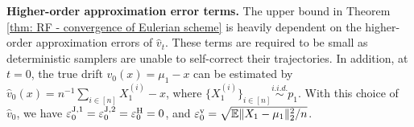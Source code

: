 \documentclass{article}
\theoremstyle{plain}
\theoremstyle{definition}
\theoremstyle{remark}
\newcommand{\red}[1]{{\color{red}#1}}
\def\bbE{\mathbb{E}}
\def\Norm#1{\Vert#1\Vert}
\def\evel{\varepsilon^{\rm v}}
\def\evelJone{\varepsilon^{\rm J,1}}
\def\evelJtwo{\varepsilon^{\rm J,2}}
\def\evelH{\varepsilon^{\rm H}}
\begin{document}
\textbf{Higher-order approximation error terms.} The upper bound in Theorem \ref{thm: RF - convergence of Eulerian scheme} is heavily dependent on the higher-order approximation errors of $\widehat v_t$. These terms are required to be small as deterministic samplers are unable to self-correct their trajectories. In addition, at $t = 0$, the true drift $v_0(x) = \mu_1 - x$ can be estimated by $\widehat v_0(x) = n^{-1} \sum_{i \in [n]} {X_1^{(i)}} - x$, where $\{X_1^{(i)}\}_{i\in [n]} \overset{i.i.d.}{\sim } p_1$. With this choice of $\widehat v_0$, we have $\evelJone_0 = \evelJtwo_0 = \evelH_0 = 0$, and $\evel_0 = \sqrt{\bbE \Norm{X_1 - \mu_1}_2^2/n} $.

\end{document}
